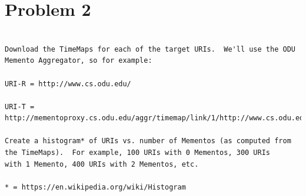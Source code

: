 

\section{Problem 2}
\label{part2}
\begin{verbatim}

Download the TimeMaps for each of the target URIs.  We'll use the ODU 
Memento Aggregator, so for example:

URI-R = http://www.cs.odu.edu/

URI-T = http://mementoproxy.cs.odu.edu/aggr/timemap/link/1/http://www.cs.odu.edu/

Create a histogram* of URIs vs. number of Mementos (as computed from
the TimeMaps).  For example, 100 URIs with 0 Mementos, 300 URIs
with 1 Memento, 400 URIs with 2 Mementos, etc.

* = https://en.wikipedia.org/wiki/Histogram

\end{verbatim}

